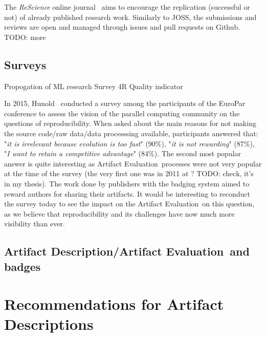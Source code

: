 \documentclass[sigconf,natbib=false]{acmart}
\newcommand{\ad}{Artifact Description}
\newcommand{\aeval}{Artifact Evaluation}
\newcommand{\adae}{\ad/\aeval}
\newcommand{\todo}[1]{{\color{red}TODO: #1}}
\begin{document}
The \emph{ReScience} online journal\ \cite{rougier2017sustainable, rougier2019rescience} aims to encourage the replication (successful or not) of already published research work.
Similarly to JOSS, the submissions and reviews are open and managed through issues and pull requests on Github.
\todo{more}

\subsection{Surveys}

Propogation of ML research  \cite{kang2023papers}
Survey 4R \cite{hernandez2023repeatability}
Quality indicator \cite{castell2024towards}

In 2015, Hunold\ \cite{hunold2015survey} conducted a survey among the participants of the EuroPar conference to assess the vision of the parallel computing community on the questions of reproducibility. 
When asked about the main reasons for not making the source code/raw data/data processsing available, participants answered that: "\emph{it is irrelevant because evolution is too fast}" (90\%), "\emph{it is not rewarding}" (87\%), "\emph{I want to retain a competitive advantage}" (84\%).
The second most popular answer is quite interesting as \aeval\ processes were not very popular at the time of the survey (the very first one was in 2011 at ? \todo{check, it's in my thesis}).
The work done by publishers with the badging system aimed to reward authors for sharing their artifacts.
It would be interesting to reconduct the survey today to see the impact on the \aeval\ on this question, as we believe that reproducibility and its challenges have now much more visibility than ever.

\subsection{\adae\ and badges}

\cite{winter2022retrospective}
\cite{hermann2022has}
\cite{hermann2020community}

\cite{beller2020will}



%
\section{Recommendations for \ad s}
\end{document}
